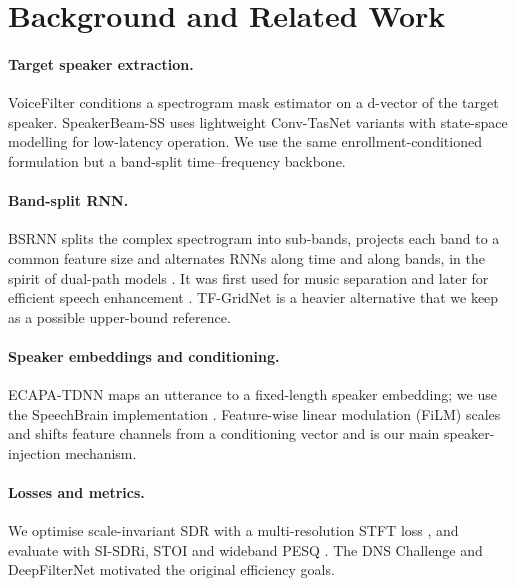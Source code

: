 \documentclass[11pt,a4paper]{article}
\newcommand{\sisdri}{SI-SDRi}
\begin{document}
\section{Background and Related Work}
\label{sec:related}

\paragraph{Target speaker extraction.}
VoiceFilter \cite{wang2019voicefilter} conditions a spectrogram mask estimator on a d-vector of the
target speaker. SpeakerBeam-SS \cite{sato2024speakerbeamss} uses lightweight Conv-TasNet variants
with state-space modelling for low-latency operation. We use the same enrollment-conditioned
formulation but a band-split time--frequency backbone.

\paragraph{Band-split RNN.}
BSRNN \cite{luo2023bsrnn} splits the complex spectrogram into sub-bands, projects each band to a
common feature size and alternates RNNs along time and along bands, in the spirit of dual-path
models \cite{luo2020dprnn}. It was first used for music separation and later for efficient speech
enhancement \cite{yu2023efficient}. TF-GridNet \cite{wang2023tfgridnet} is a heavier alternative
that we keep as a possible upper-bound reference.

\paragraph{Speaker embeddings and conditioning.}
ECAPA-TDNN \cite{desplanques2020ecapa} maps an utterance to a fixed-length speaker embedding; we
use the SpeechBrain implementation \cite{ravanelli2021speechbrain}. Feature-wise linear modulation
(FiLM) \cite{perez2018film} scales and shifts feature channels from a conditioning vector and is
our main speaker-injection mechanism.

\paragraph{Losses and metrics.}
We optimise scale-invariant SDR \cite{leroux2019sdr} with a multi-resolution STFT loss
\cite{yamamoto2020pwg}, and evaluate with \sisdri, STOI \cite{taal2011stoi} and wideband PESQ
\cite{itu2007p8622}. The DNS Challenge \cite{reddy2020dns} and DeepFilterNet
\cite{schroter2022deepfilternet} motivated the original efficiency goals.
\end{document}
